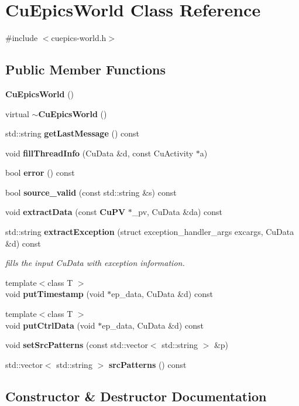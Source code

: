 \section{Cu\+Epics\+World Class Reference}
\label{classCuEpicsWorld}


{\ttfamily \#include $<$cuepics-\/world.\+h$>$}

\subsection*{Public Member Functions}
\begin{DoxyCompactItemize}
\item 
\textbf{ Cu\+Epics\+World} ()
\item 
virtual \textbf{ $\sim$\+Cu\+Epics\+World} ()
\item 
std\+::string \textbf{ get\+Last\+Message} () const
\item 
void \textbf{ fill\+Thread\+Info} (Cu\+Data \&d, const Cu\+Activity $\ast$a)
\item 
bool \textbf{ error} () const
\item 
bool \textbf{ source\+\_\+valid} (const std\+::string \&s) const
\item 
void \textbf{ extract\+Data} (const \textbf{ Cu\+PV} $\ast$\+\_\+pv, Cu\+Data \&da) const
\item 
std\+::string \textbf{ extract\+Exception} (struct exception\+\_\+handler\+\_\+args excargs, Cu\+Data \&d) const
\begin{DoxyCompactList}\small\item\em fills the input Cu\+Data with exception information. \end{DoxyCompactList}\item 
{\footnotesize template$<$class T $>$ }\\void \textbf{ put\+Timestamp} (void $\ast$ep\+\_\+data, Cu\+Data \&d) const
\item 
{\footnotesize template$<$class T $>$ }\\void \textbf{ put\+Ctrl\+Data} (void $\ast$ep\+\_\+data, Cu\+Data \&d) const
\item 
void \textbf{ set\+Src\+Patterns} (const std\+::vector$<$ std\+::string $>$ \&p)
\item 
std\+::vector$<$ std\+::string $>$ \textbf{ src\+Patterns} () const
\end{DoxyCompactItemize}


\subsection{Constructor \& Destructor Documentation}
\mbox{\label{classCuEpicsWorld_ab42c206f9bad4e5491052ddeda4ac773}} 
